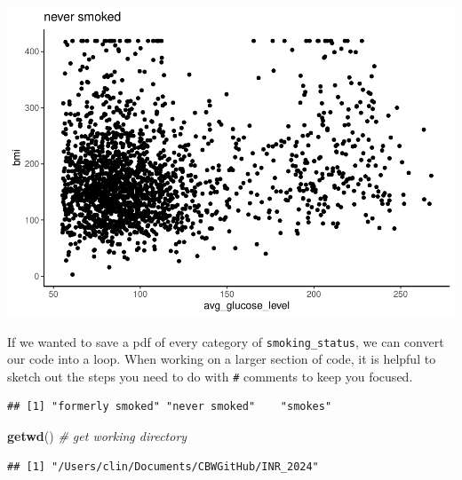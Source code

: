 \documentclass[
]{book}
\newenvironment{Shaded}{\begin{snugshade}}{\end{snugshade}}
\newcommand{\CommentTok}[1]{\textcolor[rgb]{0.56,0.35,0.01}{\textit{#1}}}
\newcommand{\FunctionTok}[1]{\textcolor[rgb]{0.13,0.29,0.53}{\textbf{#1}}}
\newcommand{\NormalTok}[1]{#1}
\newcommand{\OtherTok}[1]{\textcolor[rgb]{0.56,0.35,0.01}{#1}}
\newcommand{\SpecialCharTok}[1]{\textcolor[rgb]{0.81,0.36,0.00}{\textbf{#1}}}
\begin{document}
\includegraphics{_main_files/figure-latex/unnamed-chunk-88-1.pdf}

If we wanted to save a pdf of every category of \texttt{smoking\_status}, we can convert our code into a loop. When working on a larger section of code, it is helpful to sketch out the steps you need to do with \texttt{\#} comments to keep you focused.

\begin{Shaded}
\end{Shaded}

\begin{verbatim}
## [1] "formerly smoked" "never smoked"    "smokes"
\end{verbatim}

\begin{Shaded}
\begin{Highlighting}[]
\FunctionTok{getwd}\NormalTok{() }\CommentTok{\# get working directory}
\end{Highlighting}
\end{Shaded}

\begin{verbatim}
## [1] "/Users/clin/Documents/CBWGitHub/INR_2024"
\end{verbatim}
\end{document}
